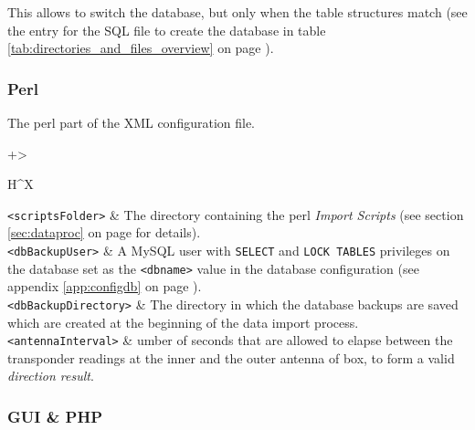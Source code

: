 \documentclass[a4paper,10pt,twoside,titlepage,headings=small,bibliography=totocnumbered,headsepline]{scrartcl}
\begin{document}
\begin{appendix}
This allows to switch the database, but only when the table structures match (see the entry for the SQL file to create the database in table \ref{tab:directories_and_files_overview} on page \pageref{tab:directories_and_files_overview}).

\subsubsection{Perl}
\label{app:configperl}

The perl part of the XML configuration file.



\begin{center} 
\begin{tabularx}{\textwidth}{+>{\raggedright\arraybackslash}H^X}
 \hline
\lstinline|<scriptsFolder>|	&	The directory containing the perl \textit{Import Scripts} (see section \ref{sec:dataproc} on page \pageref{sec:dataproc} for details). \\ \hline
\lstinline|<dbBackupUser>|	&	A MySQL user with \lstinline|SELECT| and \lstinline|LOCK TABLES| privileges on the database set as the \lstinline|<dbname>| value in the database configuration (see appendix \ref{app:configdb} on page \pageref{app:configdb}). \\ \hline
\lstinline|<dbBackupDirectory>|	&	The directory in which the database backups are saved which are created at the beginning of the data import process. \\ \hline
\lstinline|<antennaInterval>|	&	 umber of seconds that are allowed to elapse between the transponder readings at the inner and the outer antenna of box, to form a valid \textit{direction result}.\\ \hline
\end{tabularx}
\label{tab:perl_config}
\end{center} 

\subsubsection{GUI \& PHP}
\label{app:configfrontend}





\end{appendix}
\end{document}
